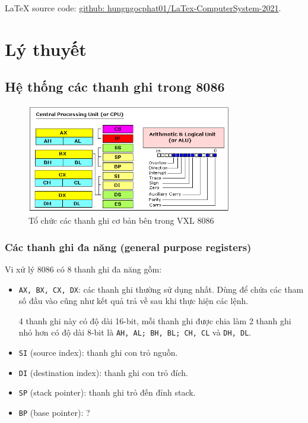 \documentclass[12pt]{report}
\newcommand{\code}[1]{\texttt{#1}}
\begin{document}
{\LaTeX} source code: \href{https://github.com/hungngocphat01/LaTex-ComputerSystem-2021}{github: hungngocphat01/LaTex-ComputerSystem-2021}.
\pagebreak

\renewcommand*\contentsname{Mục lục}
\setcounter{tocdepth}{2}
\tableofcontents
\pagebreak

\chapter{Lý thuyết} \label{chapterLyThuyet}
\pagebreak


\section{Hệ thống các thanh ghi trong 8086}

\begin{figure}[H]
    \centering
    \includegraphics[width=0.8\textwidth]{image/cpu.png}
    \caption{Tổ chức các thanh ghi cơ bản bên trong VXL 8086}
\end{figure}

\subsection{Các thanh ghi đa năng (general purpose registers)}
Vi xử lý 8086 có 8 thanh ghi đa năng gồm:
\begin{itemize}
    \item \code{AX, BX, CX, DX}: các thanh ghi thường sử dụng nhất. Dùng để chứa các tham số đầu vào cũng như kết quả trả về sau khi thực hiện các lệnh.
    \par 4 thanh ghi này có độ dài 16-bit, mỗi thanh ghi được chia làm 2 thanh ghi nhỏ hơn có độ dài 8-bit là \code{AH, AL; BH, BL; CH, CL} và \code{DH, DL}.
    \item \code{SI} (source index): thanh ghi con trỏ nguồn.
    \item \code{DI} (destination index): thanh ghi con trỏ đích.
    \item \code{SP} (stack pointer): thanh ghi trỏ đến đỉnh stack.
    \item \code{BP} (base pointer): ?
\end{itemize}
\end{document}
